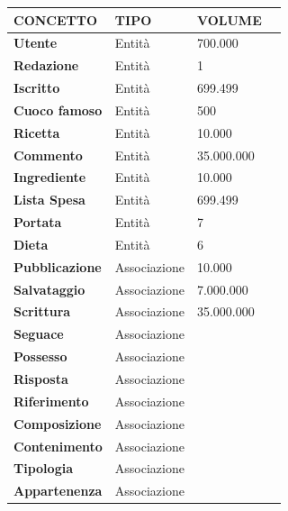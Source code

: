 \documentclass[12pt]{extarticle}
\begin{document}
\vspace{2cm}
    \begin{tabularx}{\textwidth}{X|X|X|X}
    \bfseries CONCETTO     & \bfseries TIPO  & \bfseries VOLUME \\ 
    \hline\hline
    \bfseries Utente        & Entità        &   700.000 \\ 
    \hline
    \bfseries Redazione     & Entità        & 1 \\
    \hline
    \bfseries Iscritto      & Entità        & 699.499 \\
    \hline
    \bfseries Cuoco famoso  & Entità        & 500 \\
    \hline
    \bfseries Ricetta       & Entità        & 10.000 \\
    \hline
    \bfseries Commento      & Entità        & 35.000.000 \\
    \hline
    \bfseries Ingrediente   & Entità        & 10.000 \\
    \hline
    \bfseries Lista Spesa   & Entità        & 699.499 \\
    \hline
    \bfseries Portata       & Entità        & 7 \\
    \hline
    \bfseries Dieta         & Entità        & 6 \\
    \hline
    \bfseries Pubblicazione & Associazione  & 10.000 \\
    \hline
    \bfseries Salvataggio   & Associazione  & 7.000.000\\
    \hline
    \bfseries Scrittura     & Associazione  & 35.000.000 \\
    \hline
    \bfseries Seguace       & Associazione  &  \\
    \hline
    \bfseries Possesso      & Associazione  &  \\
    \hline
    \bfseries Risposta      & Associazione  &  \\
    \hline
    \bfseries Riferimento   & Associazione  &  \\
    \hline
    \bfseries Composizione  & Associazione  &  \\
    \hline
    \bfseries Contenimento  & Associazione  &  \\
    \hline
    \bfseries Tipologia     & Associazione  &  \\
    \hline
    \bfseries Appartenenza  & Associazione  &  \\
    \hline
    \end{tabularx}

\newpage
\end{document}
